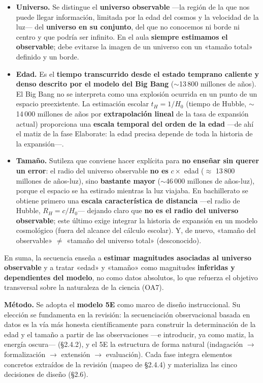 \begin{itemize}
\item \textbf{Universo.} Se distingue el \textbf{universo observable} ---la región de la que nos puede llegar información, limitada por la edad del cosmos y la velocidad de la luz--- del \textbf{universo en su conjunto}, del que no conocemos ni borde ni centro y que podría ser infinito. En el aula \textbf{siempre estimamos el observable}; debe evitarse la imagen de un universo con un «tamaño total» definido y un borde.
\item \textbf{Edad.} Es el \textbf{tiempo transcurrido desde el estado temprano caliente y denso descrito por el modelo del Big Bang} ($\sim$13\,800 millones de años). El Big Bang no se interpreta como una explosión ocurrida en un punto de un espacio preexistente. La estimación escolar $t_H=1/H_{0}$ (tiempo de Hubble, $\sim$14\,000 millones de años por \textbf{extrapolación lineal} de la tasa de expansión actual) proporciona una \textbf{escala temporal del orden de la edad} ---de ahí el matiz de la fase Elaborate: la edad precisa depende de toda la historia de la expansión---.
\item \textbf{Tamaño.} Sutileza que conviene hacer explícita para \textbf{no enseñar sin querer un error}: el radio del universo observable \textbf{no es} $c \times$ edad ($\approx$ 13\,800 millones de años-luz), sino \textbf{bastante mayor} ($\sim$46\,000 millones de años-luz), porque el espacio se ha estirado mientras la luz viajaba. En bachillerato se obtiene primero una \textbf{escala característica de distancia} ---el radio de Hubble, $R_H=c/H_{0}$--- dejando claro que \textbf{no es el radio del universo observable}; este último exige integrar la historia de expansión en un modelo cosmológico (fuera del alcance del cálculo escolar). Y, de nuevo, «tamaño del observable» $\neq$ «tamaño del universo total» (desconocido).
\end{itemize}

En suma, la secuencia enseña a \textbf{estimar magnitudes asociadas al universo observable} y a tratar «edad» y «tamaño» como magnitudes \textbf{inferidas y dependientes del modelo}, no como datos absolutos, lo que refuerza el objetivo transversal sobre la naturaleza de la ciencia (OA7).

\textbf{Método.} Se adopta el \textbf{modelo 5E} \parencite{bybee2006} como marco de diseño instruccional. Su elección se fundamenta en la revisión: la secuenciación observacional basada en datos es la vía más honesta científicamente para construir la determinación de la edad y el tamaño a partir de las observaciones ---e introducir, ya como matiz, la energía oscura--- (§2.4.2), y el 5E la estructura de forma natural (indagación $\rightarrow$ formalización $\rightarrow$ extensión $\rightarrow$ evaluación). Cada fase integra elementos concretos extraídos de la revisión (mapeo de §2.4.4) y materializa las cinco decisiones de diseño (§2.6).

